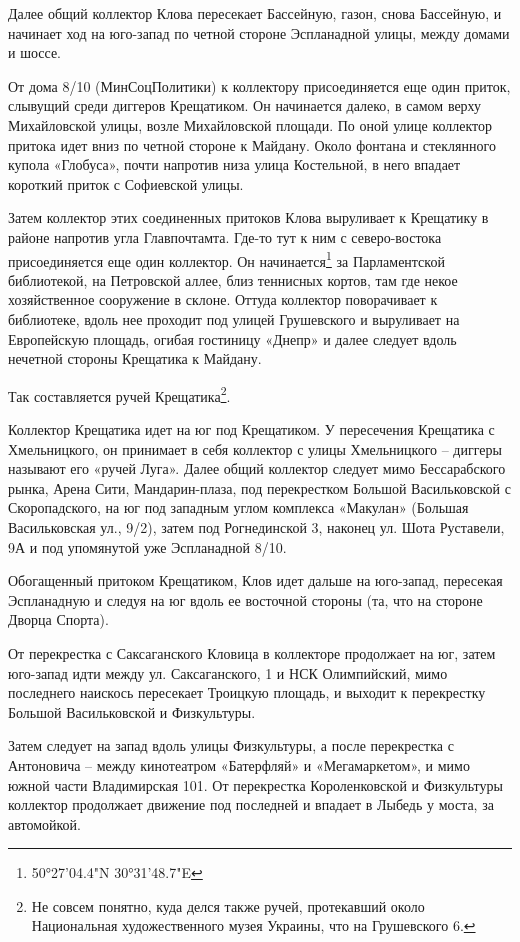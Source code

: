 Далее общий коллектор Клова пересекает Бассейную, газон, снова Бассейную, и начинает ход на юго-запад по четной стороне Эспланадной улицы, между домами и шоссе.

От дома 8/10 (МинСоцПолитики) к коллектору присоединяется еще один приток, слывущий среди диггеров Крещатиком. Он начинается далеко, в самом верху Михайловской улицы, возле Михайловской площади. По оной улице коллектор притока идет вниз по четной стороне к Майдану. Около фонтана и стеклянного купола «Глобуса», почти напротив низа улица Костельной, в него впадает короткий приток с Софиевской улицы.

Затем коллектор этих соединенных притоков Клова выруливает к Крещатику в районе напротив угла Главпочтамта. Где-то тут к ним с северо-востока присоединяется еще один коллектор. Он начинается\footnote{50°27'04.4"N 30°31'48.7"E} за Парламентской библиотекой, на Петровской аллее, близ теннисных кортов, там где некое хозяйственное сооружение в склоне. Оттуда коллектор поворачивает к библиотеке, вдоль нее проходит под улицей Грушевского и выруливает на Европейскую площадь, огибая гостиницу «Днепр» и далее следует вдоль нечетной стороны Крещатика к Майдану. 

Так составляется ручей Крещатика\footnote{Не совсем понятно, куда делся также ручей, протекавший около Национальная художественного музея Украины, что на Грушевского 6.}. 

Коллектор Крещатика идет на юг под Крещатиком. У пересечения Крещатика с Хмельницкого, он принимает в себя коллектор с улицы Хмельницкого – диггеры называют его «ручей Луга». Далее общий коллектор следует мимо Бессарабского рынка, Арена Сити, Мандар\-ин-плаза, под перекрестком Большой Васильковской с Скоропадского, на юг под западным углом комплекса «Макулан» (Большая Васильковская ул., 9/2), затем под Рогнединской 3, наконец ул. Шота Руставели, 9А и под упомянутой уже Эспланадной 8/10.

Обогащенный притоком Крещатиком, Клов идет дальше на юго-запад, пересекая Эспланадную и следуя на юг вдоль ее восточной стороны (та, что на стороне Дворца Спорта).

От перекрестка с Саксаганского Кловица в коллекторе продолжает на юг, затем юго-запад идти между ул. Саксаганского, 1 и НСК Олимпийский, мимо последнего наискось пересекает Троицкую площадь, и выходит к перекрестку Большой Васильковской и Физкультуры.

Затем следует на запад вдоль улицы Физкультуры, а после перекрестка с Антоновича – между кинотеатром «Батерфляй» и «Мегамаркетом», и мимо южной части Владимирская 101. От перекрестка Короленковской и Физкультуры коллектор продолжает движение под последней и впадает в Лыбедь у моста, за автомойкой.\\ 

